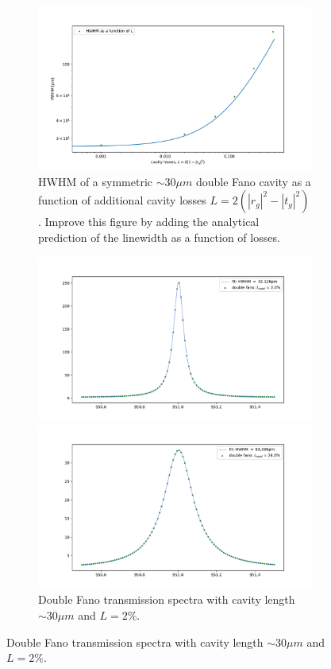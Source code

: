 \begin{figure}[h!]
    \centering
    \begin{subfigure}[c]{0.64\textwidth}
        \centering
        \includegraphics[width=\textwidth]{figures/linewidth_vs_losses.pdf}
        \caption{HWHM of a symmetric $\sim 30 \mu m$ double Fano cavity as a function of additional cavity losses $L = 2(|r_g|^2 - |t_g|^2)$. Improve this figure by adding the analytical prediction of the linewidth as a function of losses.}
        \label{fig:HWHM_vs_losses}
    \end{subfigure}
    \begin{subfigure}[c]{0.34\textwidth}
        \includegraphics[width=\textwidth]{figures/double_2_loss_30um.pdf}
        \caption{Double Fano transmission spectra with cavity length $\sim 30 \mu m$ and $L = 2\%$.}
        \includegraphics[width=\textwidth]{figures/double_24_loss_30um.pdf}

\end{subfigure}
\end{figure}
